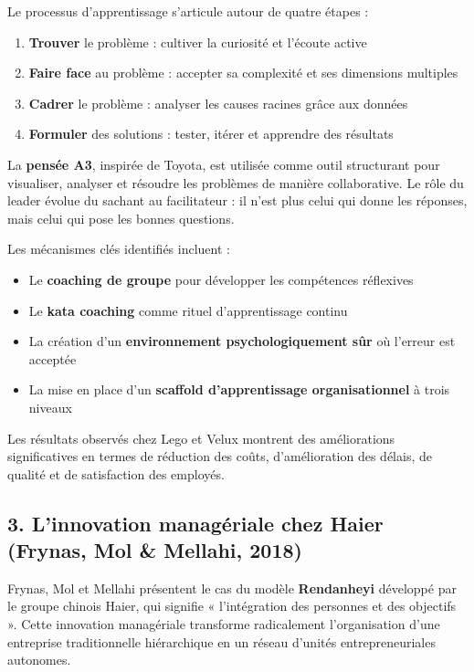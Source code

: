 \documentclass{rapportECL}
\begin{document}
Le processus d'apprentissage s'articule autour de quatre étapes :
\begin{enumerate}
\item \textbf{Trouver} le problème : cultiver la curiosité et l'écoute active
\item \textbf{Faire face} au problème : accepter sa complexité et ses dimensions multiples
\item \textbf{Cadrer} le problème : analyser les causes racines grâce aux données
\item \textbf{Formuler} des solutions : tester, itérer et apprendre des résultats
\end{enumerate}

La \textbf{pensée A3}, inspirée de Toyota, est utilisée comme outil structurant pour visualiser, analyser et résoudre les problèmes de manière collaborative. Le rôle du leader évolue du sachant au facilitateur : il n'est plus celui qui donne les réponses, mais celui qui pose les bonnes questions.

\newpage

Les mécanismes clés identifiés incluent :
\begin{itemize}
\item Le \textbf{coaching de groupe} pour développer les compétences réflexives
\item Le \textbf{kata coaching} comme rituel d'apprentissage continu
\item La création d'un \textbf{environnement psychologiquement sûr} où l'erreur est acceptée
\item La mise en place d'un \textbf{scaffold d'apprentissage organisationnel} à trois niveaux
\end{itemize}

Les résultats observés chez Lego et Velux montrent des améliorations significatives en termes de réduction des coûts, d'amélioration des délais, de qualité et de satisfaction des employés.

\subsection*{3. L'innovation managériale chez Haier (Frynas, Mol \& Mellahi, 2018)}

Frynas, Mol et Mellahi présentent le cas du modèle \textbf{Rendanheyi} développé par le groupe chinois Haier, qui signifie « l'intégration des personnes et des objectifs ». Cette innovation managériale transforme radicalement l'organisation d'une entreprise traditionnelle hiérarchique en un réseau d'unités entrepreneuriales autonomes.
\end{document}
